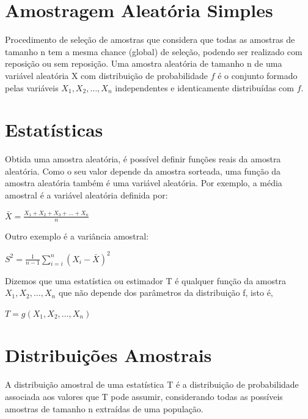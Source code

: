 \documentclass[
  letterpaper,
  DIV=11,
  numbers=noendperiod]{scrreprt}
\begin{document}

\hypertarget{amostragem-aleatuxf3ria-simples}{%
\chapter{Amostragem Aleatória
Simples}\label{amostragem-aleatuxf3ria-simples}}

Procedimento de seleção de amostras que considera que todas as amostras
de tamanho n tem a mesma chance (global) de seleção, podendo ser
realizado com reposição ou sem reposição. Uma amostra aleatória de
tamanho n de uma variável aleatória X com distribuição de probabilidade
\(f\) é o conjunto formado pelas variáveis
\(X_{1}, X_{2}, \ldots , X_{n}\) independentes e identicamente
distribuídas com \(f\).


\hypertarget{estatuxedsticas}{%
\chapter{Estatísticas}\label{estatuxedsticas}}

Obtida uma amostra aleatória, é possível definir funções reais da
amostra aleatória. Como o seu valor depende da amostra sorteada, uma
função da amostra aleatória também é uma variável aleatória. Por
exemplo, a média amostral é a variável aleatória definida por:

\(\bar{X}=\frac{X_{1}+X_{2}+X_{3}+…+X_{n}}{n}\)

Outro exemplo é a variância amostral:

\(S^{2}=\frac{1}{n-1}\sum\limits_{i=i}^{n}\left ( X_{i} - \bar{X} \right )^{2}\)

Dizemos que uma estatística ou estimador T é qualquer função da amostra
\(X_{1}, X_{2}, \ldots , X_{n}\) que não depende dos parâmetros da
distribuição f, isto é,

\(T = g(X_{1}, X_{2}, \ldots , X_{n})\)


\hypertarget{distribuiuxe7uxf5es-amostrais}{%
\chapter{Distribuições Amostrais}\label{distribuiuxe7uxf5es-amostrais}}

A distribuição amostral de uma estatística T é a distribuição de
probabilidade associada aos valores que T pode assumir, considerando
todas as possíveis amostras de tamanho n extraídas de uma população.
\end{document}
